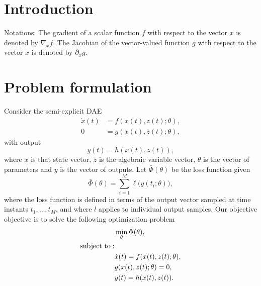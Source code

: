 \section{Introduction}

Notations: The gradient of a scalar function $f$ with respect to the vector $x$ is denoted by $\nabla_x f$. The Jacobian of the vector-valued function $g$ with respect to the vector $x$ is denoted by $\partial_x g$.




\section{Problem formulation}



Consider the semi-explicit DAE
\begin{align}
\label{eq:01090930}
\dot{{x}}(t) &= {f}({x}(t),{z}(t);{\theta}), \\
\label{eq:01090931}
0 &= {g}({x}(t),{z}(t);{\theta}),
\end{align}
with output
\begin{equation}
\label{eq:01090932}
{y}(t) = {h}({x}(t),{z}(t)),
\end{equation}
where ${x}$ is that state vector, ${z}$ is the algebraic variable vector, ${\theta}$ is the vector of parameters and ${y}$ is the vector of outputs.
Let $\bar\Phi(\theta)$ be the loss function given \begin{equation}
\bar\Phi({\theta})
=
\sum_{i=1}^M \ell\big({y}(t_i;{\theta})\big),
\end{equation}
where  the loss function is defined in terms of the output vector sampled at time instants $t_1,\dots,t_M$, and where $l$ applies to individual output samples. Our objective objective is to solve the following optimization problem
\begin{align}
\label{eq:01091047}
& \min_{\theta}  \bar\Phi({\theta}), \\
\nonumber
\textmd{subject to}: & \\
\label{eq:01091048}
& \dot{{x}}(t) = {f}({x}(t),{z}(t);{\theta}), \\
\label{eq:01091049}
 & {g}({x}(t),{z}(t);{\theta}) = 0,\\
 \label{eq:01091050}
 & y(t) = {h}({x}(t),{z}(t)).
\end{align}


